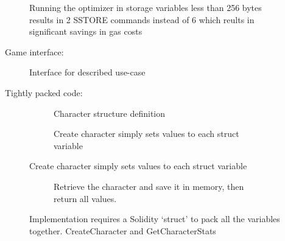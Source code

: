 \begin{appendices}
\begin{figure}[H]
  \begin{subfigure}[b]{\textwidth}
    \centering
    
  \end{subfigure}

  \begin{subfigure}[b]{\textwidth}
    \centering
    
  \end{subfigure}
  \caption{Running the optimizer in storage variables less than 256 bytes results in 2 SSTORE commands instead of 6 which reults in significant savings in gas costs}
  \label{fig:struct_optimization}
\end{figure}
Game interface:
\begin{figure}[H]
    \centering
    
    \caption{Interface for described use-case}
    \label{fig:game_interface}
\end{figure}

Tightly packed code:
\begin{figure}[H]
  \begin{subfigure}[b]{\textwidth}
    \centering
    
    \caption{Character structure definition}
    \label{fig:struct_optimization:a}
  \end{subfigure}

  \begin{subfigure}[b]{\textwidth}
    \centering
    
    \caption{Create character simply sets values to each struct variable}
    \label{fig:struct_optimization:b}
  \end{subfigure}
\end{figure}

\begin{figure}[H] \ContinuedFloat
  \begin{subfigure}[b]{\textwidth}
    \centering
    
    \caption{Retrieve the character and save it in memory, then return all values.}
    \label{fig:struct_optimization:c}
  \end{subfigure}
  \caption{Implementation requires a Solidity `struct' to pack all the variables together. CreateCharacter and GetCharacterStats  }
  \label{fig:struct_optimization}
\end{figure}


\end{appendices}
